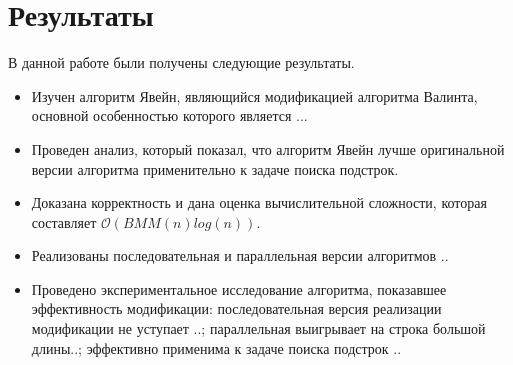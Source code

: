 \documentclass[14pt]{matmex-diploma-custom}
\begin{document}
\section{Результаты}
В данной работе были получены следующие результаты.

\begin{itemize}
	\item Изучен алгоритм Явейн, являющийся модификацией алгоритма Валинта, основной особенностью которого является ...
	\item Проведен анализ, который показал, что алгоритм Явейн лучше оригинальной версии алгоритма применительно к задаче поиска подстрок.
	\item Доказана корректность и дана оценка вычислительной сложности, которая составляет $\mathcal{O}(BMM(n)log(n))$.
	\item Реализованы последовательная и параллельная версии алгоритмов ..
	\item Проведено экспериментальное исследование алгоритма, показавшее эффективность модификации: последовательная версия реализации модификации не уступает ..; параллельная выигрывает на строка большой длины..; эффективно применима к задаче поиска подстрок ..
\end{itemize}

\setmonofont[Mapping=tex-text]{CMU Typewriter Text}


\end{document}
